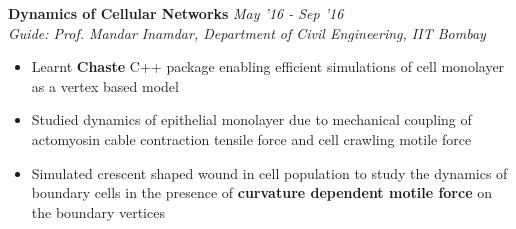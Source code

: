 \documentclass[10pt]{article}%
\begin{document}
{{\flushleft \bf \large{Dynamics of Cellular Networks}}  \hfill \textit{May '16 - Sep '16} \\
{\em Guide: Prof. Mandar Inamdar, Department of Civil Engineering, IIT Bombay} 

\begin{itemize}
    \setlength\itemsep{0.01em}
    \item Learnt \textbf{Chaste} C++ package enabling efficient simulations of cell monolayer as a vertex based model
    \item Studied dynamics of epithelial monolayer due to mechanical coupling of actomyosin cable contraction tensile force and cell crawling motile force
    \item Simulated crescent shaped wound in cell population to study the dynamics of boundary cells in the presence of \textbf{curvature dependent motile force} on the boundary vertices
\end{itemize}






}
\end{document}
